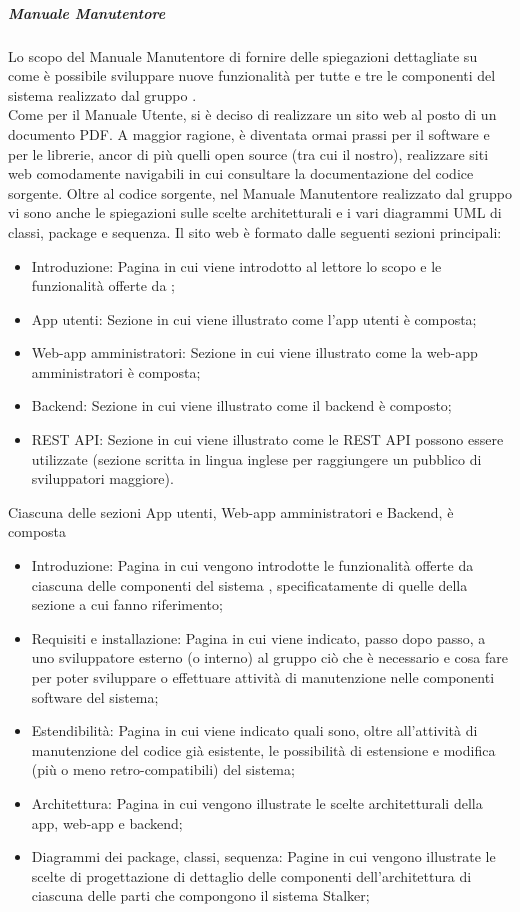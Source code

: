 \subparagraph*{Manuale Manutentore}
Lo scopo del Manuale Manutentore di fornire delle spiegazioni dettagliate su come è possibile sviluppare nuove funzionalità per tutte e tre le componenti del sistema \NomeProgetto{} realizzato dal gruppo \Gruppo{}.\\
Come per il Manuale Utente, si è deciso di realizzare un sito web al posto di un documento PDF. A maggior ragione, è diventata ormai prassi per il software e per le librerie, ancor di più quelli open source (tra cui il nostro), realizzare siti web comodamente navigabili in cui consultare la documentazione del codice sorgente.
Oltre al codice sorgente, nel Manuale Manutentore realizzato dal gruppo vi sono anche le spiegazioni sulle scelte architetturali e i vari diagrammi UML di classi, package e sequenza.
Il sito web è formato dalle seguenti sezioni principali:
\begin{itemize}
    \item Introduzione: Pagina in cui viene introdotto al lettore lo scopo e le funzionalità offerte da \NomeProgetto{};
    \item App utenti: Sezione in cui viene illustrato come l'app utenti è composta;
    \item Web-app amministratori: Sezione in cui viene illustrato come la web-app amministratori è composta;
    \item Backend: Sezione in cui viene illustrato come il backend è composto;
    \item REST API: Sezione in cui viene illustrato come le REST API possono essere utilizzate (sezione scritta in lingua inglese per raggiungere un pubblico di sviluppatori maggiore).
\end{itemize}

Ciascuna delle sezioni App utenti, Web-app amministratori e Backend, è composta
\begin{itemize}
    \item Introduzione: Pagina in cui vengono introdotte le funzionalità offerte da ciascuna delle componenti del sistema \NomeProgetto{}, specificatamente di quelle della sezione a cui fanno riferimento;
    \item Requisiti e installazione: Pagina in cui viene indicato, passo dopo passo, a uno sviluppatore esterno (o interno) al gruppo ciò che è necessario e cosa fare per poter sviluppare o effettuare attività di manutenzione nelle componenti software del sistema;
    \item Estendibilità: Pagina in cui viene indicato quali sono, oltre all'attività di manutenzione del codice già esistente, le possibilità di estensione e modifica (più o meno retro-compatibili) del sistema;
    \item Architettura: Pagina in cui vengono illustrate le scelte architetturali della app, web-app e backend;
    \item Diagrammi dei package, classi, sequenza: Pagine in cui vengono illustrate le scelte di progettazione di dettaglio delle componenti dell'architettura di ciascuna delle parti che compongono il sistema Stalker;
\end{itemize}


